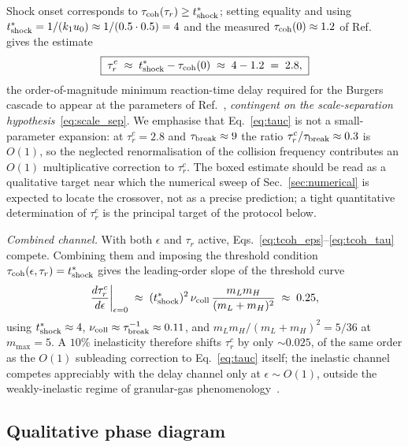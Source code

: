 \documentclass[aps,pre,twocolumn,superscriptaddress,longbibliography,floatfix]{revtex4-2}
\begin{document}
Shock onset corresponds
to $\tau_{\rm coh}(\tau_r)\geq t^*_{\rm shock}$; setting
equality and using
$t^*_{\rm shock}=1/(k_1 u_0)\approx 1/(0.5\cdot 0.5)=4$ and
the measured $\tau_{\rm coh}(0)\approx 1.2$ of
Ref.~\cite{PaperIII} gives the estimate
\begin{equation}
\boxed{\;\tau_r^c \;\approx\; t^*_{\rm shock}
- \tau_{\rm coh}(0) \;\approx\; 4 - 1.2 \;=\; 2.8,\;}
\label{eq:tauc}
\end{equation}
the order-of-magnitude minimum reaction-time delay
required for the Burgers cascade to appear at the
parameters of Ref.~\cite{PaperIII},
\emph{contingent on the scale-separation
hypothesis}~\eqref{eq:scale_sep}.
We emphasise that
Eq.~\eqref{eq:tauc} is not a small-parameter expansion: at
$\tau_r^c=2.8$ and $\tau_{\rm break}\approx 9$ the ratio
$\tau_r^c/\tau_{\rm break}\approx 0.3$ is $O(1)$, so the
neglected renormalisation of the collision frequency
contributes an $O(1)$ multiplicative correction to
$\tau_r^c$. The boxed estimate should be read as a
qualitative target near which the numerical sweep of
Sec.~\ref{sec:numerical} is expected to locate the
crossover, not as a precise prediction; a tight
quantitative determination of $\tau_r^c$ is the principal
target of the protocol below.

\emph{Combined channel.} With both $\epsilon$ and $\tau_r$
active, Eqs.~\eqref{eq:tcoh_eps}--\eqref{eq:tcoh_tau} compete.
Combining them and imposing the threshold condition
$\tau_{\rm coh}(\epsilon,\tau_r)=t^*_{\rm shock}$ gives the
leading-order slope of the threshold curve
\begin{equation}
\frac{d\tau_r^c}{d\epsilon}\bigg|_{\epsilon=0}
\;\approx\; (t^*_{\rm shock})^2\,\nu_{\rm coll}\,
\frac{m_L m_H}{(m_L+m_H)^2}
\;\approx\; 0.25,
\label{eq:slope}
\end{equation}
using $t^*_{\rm shock}\approx 4$,
$\nu_{\rm coll}\approx \tau_{\rm break}^{-1}\approx 0.11$,
and $m_L m_H/(m_L+m_H)^2=5/36$ at $m_{\max}=5$. A $10\%$
inelasticity therefore shifts $\tau_r^c$ by only
$\sim 0.025$, of the same order as the $O(1)$ subleading
correction to Eq.~\eqref{eq:tauc} itself; the inelastic
channel competes appreciably with the delay channel only
at $\epsilon\sim O(1)$, outside the
weakly-inelastic regime of granular-gas
phenomenology~\cite{BrilliantovPoschel}.

\subsection{Qualitative phase diagram}
\end{document}
